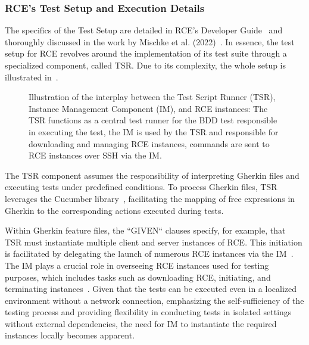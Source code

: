 \subsubsection{\ac{RCE}'s Test Setup and Execution Details}
The specifics of the Test Setup are detailed in \ac{RCE}'s Developer Guide~\cite{rceDevGuide10x} and thoroughly discussed in the work by Mischke et al. (2022)~\cite{10.1007/978-3-031-08760-8_44}. In essence, the test setup for \ac{RCE} revolves around the implementation of its test suite through a specialized component, called \acf{TSR}.
Due to its complexity, the whole setup is illustrated in~.

\begin{figure}[h]
    \centering
    
    \caption{Illustration of the interplay between the Test Script Runner (TSR), Instance Management Component (IM), and RCE instances: The TSR functions as a central test runner for the BDD test responsible in executing the test, the IM is used by the TSR and responsible for downloading and managing RCE instances, commands are sent to RCE instances over SSH via the IM.}
    \label{fig:rce-setup}
\end{figure}

The \ac{TSR} component assumes the responsibility of interpreting Gherkin files and executing tests under predefined conditions. To process Gherkin files, \ac{TSR} leverages the Cucumber library~\cite{10.1007/978-3-031-08760-8_44}, facilitating the mapping of free expressions in Gherkin to the corresponding actions executed during tests.

Within Gherkin feature files, the ``GIVEN`` clauses specify, for example, that \ac{TSR} must instantiate multiple client and server instances of \ac{RCE}. This initiation is facilitated by delegating the launch of numerous \ac{RCE} instances via the \acf{IM}~\cite{rceDevGuide10x}. 
The \ac{IM} plays a crucial role in overseeing \ac{RCE} instances used for testing purposes, which includes tasks such as downloading \ac{RCE}, initiating, and terminating instances~\cite{10.1007/978-3-031-08760-8_44,rceDevGuide10x}. Given that the tests can be executed even in a localized environment without a network connection, emphasizing the self-sufficiency of the testing process and providing flexibility in conducting tests in isolated settings without external dependencies, the need for \ac{IM} to instantiate the required instances locally becomes apparent.

